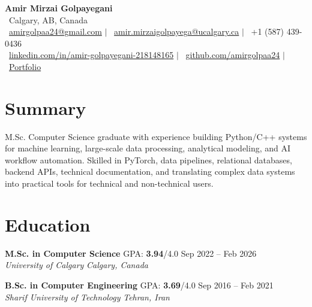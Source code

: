 \documentclass[a4paper,10pt]{article}
\newcommand{\resumeEducationSubheading}[5]{
    \textbf{#1} \hfill #2 \hfill #3 \\
    \textit{#4} \hfill \textit{#5}
}
\begin{document}

\begin{center}
    {\LARGE \textbf{Amir Mirzai Golpayegani}} \\[0.25em]
    \faMapMarker*~Calgary, AB, Canada \\[0.25em]
    \faEnvelope~\href{mailto:amirgolpaa24@gmail.com}{amirgolpaa24@gmail.com}
    $|$
    \faEnvelope~\href{mailto:amir.mirzaigolpayega@ucalgary.ca}{amir.mirzaigolpayega@ucalgary.ca}
    $|$
    \faPhone*~+1 (587) 439-0436 \\[0.25em]
    \faLinkedin~\href{https://linkedin.com/in/amir-golpayegani-218148165}{linkedin.com/in/amir-golpayegani-218148165}
    $|$
    \faGithub~\href{https://github.com/amirgolpaa24}{github.com/amirgolpaa24}
    $|$
    \faGlobe~\href{https://amir-portfolio-navy.vercel.app/}{Portfolio}
\end{center}


\section*{Summary}

M.Sc. Computer Science graduate with experience building Python/C++ systems for machine learning, large-scale data processing, analytical modeling, and AI workflow automation. Skilled in PyTorch, data pipelines, relational databases, backend APIs, technical documentation, and translating complex data systems into practical tools for technical and non-technical users.


\section*{Education}

\resumeEducationSubheading
{M.Sc. in Computer Science}
{GPA: \textbf{3.94}/4.0}
{Sep 2022 -- Feb 2026}
{University of Calgary}
{Calgary, Canada}

\vspace{0.35em}

\resumeEducationSubheading
{B.Sc. in Computer Engineering}
{GPA: \textbf{3.69}/4.0}
{Sep 2016 -- Feb 2021}
{Sharif University of Technology}
{Tehran, Iran}

\end{document}
